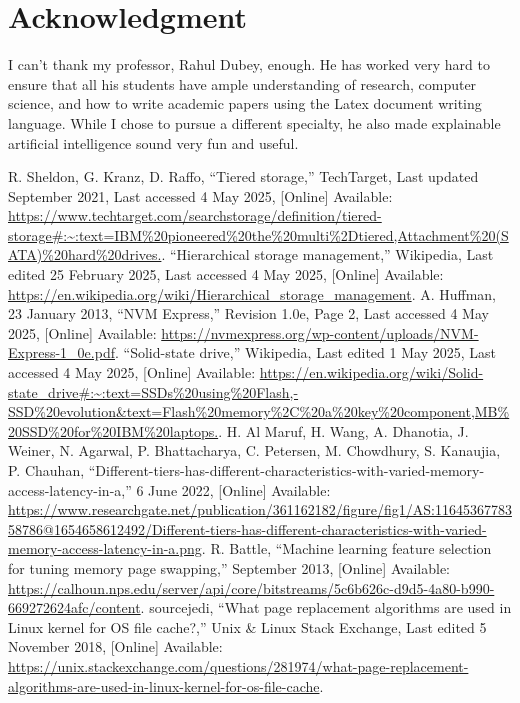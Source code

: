 \documentclass[conference]{IEEEtran}
\begin{document}
\section*{Acknowledgment}
I can't thank my professor, Rahul Dubey, enough.  He has worked very hard to ensure that all his students have ample understanding of research, computer science, and how to write academic papers using the Latex document writing language.  While I chose to pursue a different specialty, he also made explainable artificial intelligence sound very fun and useful.

\begin{thebibliography}{00}
 R. Sheldon, G. Kranz, D. Raffo, ``Tiered storage,'' TechTarget, Last updated September 2021, Last accessed 4 May 2025, [Online] Available: \url{https://www.techtarget.com/searchstorage/definition/tiered-storage#:~:text=IBM%20pioneered%20the%20multi%2Dtiered,Attachment%20(SATA)%20hard%20drives.}.
 ``Hierarchical storage management,'' Wikipedia, Last edited 25 February 2025, Last accessed 4 May 2025, [Online] Available: \url{https://en.wikipedia.org/wiki/Hierarchical_storage_management}.
 A. Huffman, 23 January 2013, ``NVM Express,'' Revision 1.0e, Page 2, Last accessed 4 May 2025, [Online] Available: \url{https://nvmexpress.org/wp-content/uploads/NVM-Express-1_0e.pdf}.
 ``Solid-state drive,'' Wikipedia, Last edited 1 May 2025, Last accessed 4 May 2025, [Online] Available: \url{https://en.wikipedia.org/wiki/Solid-state_drive#:~:text=SSDs%20using%20Flash,-SSD%20evolution&text=Flash%20memory%2C%20a%20key%20component,MB%20SSD%20for%20IBM%20laptops.}.
 H. Al Maruf, H. Wang, A. Dhanotia, J. Weiner, N. Agarwal, P. Bhattacharya, C. Petersen, M. Chowdhury, S. Kanaujia, P. Chauhan, ``Different-tiers-has-different-characteristics-with-varied-memory-access-latency-in-a,'' 6 June 2022, [Online] Available: \url{https://www.researchgate.net/publication/361162182/figure/fig1/AS:1164536778358786@1654658612492/Different-tiers-has-different-characteristics-with-varied-memory-access-latency-in-a.png}.
 R. Battle, ``Machine learning feature selection for tuning memory page swapping,'' September 2013, [Online] Available: \url{https://calhoun.nps.edu/server/api/core/bitstreams/5c6b626c-d9d5-4a80-b990-669272624afc/content}.
 sourcejedi, ``What page replacement algorithms are used in Linux kernel for OS file cache?,'' Unix \& Linux Stack Exchange, Last edited 5 November 2018, [Online] Available: \url{https://unix.stackexchange.com/questions/281974/what-page-replacement-algorithms-are-used-in-linux-kernel-for-os-file-cache}.

\end{thebibliography}
\end{document}
